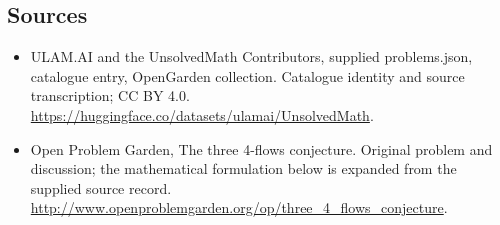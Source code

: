 \documentclass[11pt,a4paper]{article}
\begin{document}
\subsection{Sources}
\begin{itemize}
\item[S1] ULAM.AI and the UnsolvedMath Contributors, supplied problems.json, catalogue entry, OpenGarden collection. Catalogue identity and source transcription; CC BY 4.0.
\url{https://huggingface.co/datasets/ulamai/UnsolvedMath}.
\item[S2] Open Problem Garden, The three 4-flows conjecture. Original problem and discussion; the mathematical formulation below is expanded from the supplied source record.
\url{http://www.openproblemgarden.org/op/three_4_flows_conjecture}.

\end{itemize}
\end{document}
